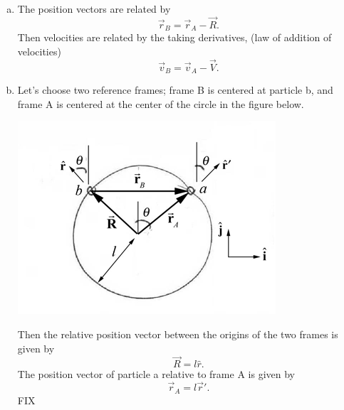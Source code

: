 \documentclass{esg8012pset}
\begin{document}
\begin{solution}
  \begin{enumerate}[a.]
    \item The position vectors are related by $$\vec r_B = \vec r_A - \vec R.$$  Then velocities are related by the taking derivatives, (law of addition of velocities) $$\vec v_B = \vec v_A - \vec V.$$  %
    \item Let's choose two reference frames; frame B is centered at particle b, and frame A is centered at the center of the circle in the figure below.
    \begin{center}\includegraphics{ps01_Solution_06_01}\end{center}
    Then the relative position vector between the origins of the two frames is given by 
    \begin{equation*} \vec R = l\hat r.\end{equation*}
    The position vector of particle a relative to frame A is given by
    \begin{equation*} \vec r_A = l\vec r'. \end{equation*}
FIX

\end{enumerate}
\end{solution}
\end{document}
